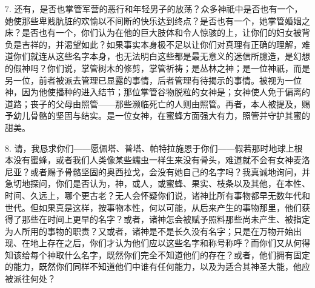 7. 还有，是否也掌管军营的恶行和年轻男子的放荡？众多神祇中是否也有一个，她使那些卑贱肮脏的欢愉以不间断的快乐达到终点？是否也有一个，她掌管婚姻之床？是否也有一个，你们认为在他的巨大肢体和令人惊骇的上，让你们的妇女被背负是吉祥的，并渴望如此？如果事实本身极不足以让你们对真理有正确的理解，难道你们就连从这些名字本身，也无法明白这些都是最无意义的迷信所臆造，是幻想的假神吗？你们说，掌管树木的修剪，掌管祈祷；是丛林之神；是一位神祇，而是另一位，前者被派去管理已显露的事情，后者管理有待揭示的事情。被视为一位神，因为他使播种的进入结节；那位掌管谷物脱粒的女神是；女神使人免于偏离的道路；丧子的父母由照管——那些濒临死亡的人则由照管。再者，本人被提及，赐予幼儿骨骼的坚固与结实。是一位女神，在蜜蜂方面强大有力，照管并守护其蜜的甜美。\par

8. 请，我恳求你们——愿佩塔、普塔、帕特拉施恩于你们——假若那时地球上根本没有蜜蜂，或者我们人类像某些蠕虫一样生来没有骨头，难道就不会有女神麦洛尼亚？或者赐予骨骼坚固的奥西拉戈，会没有她自己的名字吗？我真诚地询问，并急切地探问，你们是否认为，神，或人，或蜜蜂、果实、枝条以及其他，在本性、时间、久远上，哪个更古老？无人会怀疑你们说，诸神比所有事物都早无数年代和世代。但如果真是这样，按事物本性，何以可能，从后来产生的事物那里，他们获得了那些在时间上更早的名字？或者，诸神怎会被赋予照料那些尚未产生、被指定为人所用的事物的职责？又或者，诸神是不是长久没有名字；只是在万物开始出现、在地上存在之后，你们才认为他们应以这些名字和称号称呼？而你们又从何得知该给每个神取什么名字，既然你们完全不知道他们的存在？或者，他们拥有固定的能力，既然你们同样不知道他们中谁有任何能力，以及为适合其神圣大能，他应被派往何处？\par

